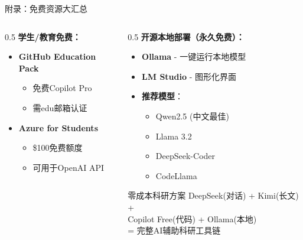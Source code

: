 \documentclass[aspectratio=169,11pt]{beamer}
\begin{document}
\begin{frame}{附录：免费资源大汇总}
\begin{columns}
\begin{column}{0.5\textwidth}
            \vspace{0.3cm}
            \textbf{学生/教育免费：}
            \begin{itemize}
                \item \textbf{GitHub Education Pack}
                    \begin{itemize}
                        \item 免费Copilot Pro
                        \item 需edu邮箱认证
                    \end{itemize}
                \item \textbf{Azure for Students}
                    \begin{itemize}
                        \item \$100免费额度
                        \item 可用于OpenAI API
                    \end{itemize}
            \end{itemize}
        \end{column}
        \begin{column}{0.5\textwidth}
            \textbf{开源本地部署（永久免费）：}
            \begin{itemize}
                \item \textbf{Ollama} - 一键运行本地模型
                \item \textbf{LM Studio} - 图形化界面
                \item \textbf{推荐模型}：
                    \begin{itemize}
                        \item Qwen2.5 (中文最佳)
                        \item Llama 3.2
                        \item DeepSeek-Coder
                        \item CodeLlama
                    \end{itemize}
            \end{itemize}
            
            \vspace{0.3cm}
            \begin{exampleblock}{零成本科研方案}
                \small
                DeepSeek(对话) + Kimi(长文) + \\
                Copilot Free(代码) + Ollama(本地) \\
                = 完整AI辅助科研工具链
            \end{exampleblock}
        \end{column}
    \end{columns}
\end{frame}
\end{document}
